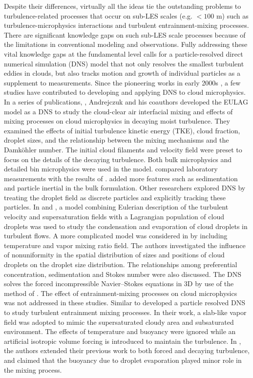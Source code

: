 Despite their differences, virtually all the ideas tie the outstanding problems to turbulence-related processes that occur on sub-LES scales (e.g. $< 100$ m) such as turbulence-microphysics interactions and turbulent entrainment-mixing processes. There are significant knowledge gaps on such sub-LES scale processes because of the limitations in conventional modeling and observations. Fully addressing these vital knowledge gaps at the fundamental level calls for a particle-resolved direct numerical simulation (DNS) model that not only resolves the smallest turbulent eddies in clouds, but also tracks motion and growth of individual particles as a supplement to measurements. Since the pioneering works in early 2000s \cite{Vaillancourt00, Vaillancourt02}, a few studies have contributed to developing and applying DNS to cloud microphysics. In a series of publications, \cite{And04, And06, And09}, Andrejczuk and his coauthors developed the EULAG model as a DNS to study the cloud-clear air interfacial mixing and effects of mixing processes on cloud microphysics in decaying moist turbulence. They examined the effects of initial turbulence kinetic energy (TKE), cloud fraction, droplet sizes, and the relationship between the mixing mechanisms and the Damk\"{o}hler number. The initial cloud filaments and velocity field were preset to focus on the details of the decaying turbulence. Both bulk microphysics and detailed bin microphysics were used in the model. \cite{Malinowski2008} compared laboratory measurements with the results of \cite{And04, And06}. \cite{LozarMellado2013} added more features such as sedimentation and particle inertial in the bulk formulation. Other researchers explored DNS by treating the droplet field as discrete particles and explicitly tracking these particles. In \cite{Lanotte2009} and \cite{Celani05}, a model combining Eulerian description of the turbulent velocity and supersaturation fields with a Lagrangian population of cloud droplets was used to study the condensation and evaporation of cloud droplets in turbulent flows. A more complicated model was considered in \cite{Vaillancourt00, Vaillancourt02} by including temperature and vapor mixing ratio field. The authors investigated the influence of nonuniformity in the spatial distribution of sizes and positions of cloud droplets on the droplet size distribution. The relationships among preferential concentration, sedimentation and Stokes number were also discussed. The DNS solves the forced incompressible Navier–Stokes equations in 3D by use of the method of \cite{Sullivan1994}. The effect of entrainment-mixing processes on cloud microphysics was not addressed in these studies. Similar to \cite{Vaillancourt02, Lanotte2009, Kumar11, Kumar12} developed a particle resolved DNS to study turbulent entrainment mixing processes. In their work, a slab-like vapor field was adopted to mimic the supersaturated cloudy area and subsaturated environment. The effects of temperature and buoyancy were ignored while an artificial isotropic volume forcing is introduced to maintain the turbulence. In \cite{Kumar14}, the authors extended their previous work to both forced and decaying turbulence, and claimed that the buoyancy due to droplet evaporation played minor role in the mixing process. 

